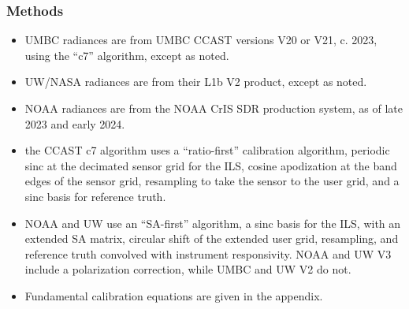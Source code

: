 \documentclass[9pt]{beamer}
\begin{document}
\begin{frame}
\frametitle{Methods}
\begin{itemize}

  \item UMBC radiances are from UMBC CCAST versions V20 or V21,
    c. 2023, using the ``c7'' algorithm, except as noted.

  \item UW/NASA radiances are from their L1b V2 product, except as
    noted. 

  \item NOAA radiances are from the NOAA CrIS SDR production system,
    as of late 2023 and early 2024.

  \item the CCAST c7 algorithm uses a ``ratio-first'' calibration
    algorithm, periodic sinc at the decimated sensor grid for the
    ILS, cosine apodization at the band edges of the sensor grid,
    resampling to take the sensor to the user grid, and a sinc basis
    for reference truth.

  \item NOAA and UW use an ``SA-first'' algorithm, a sinc basis for
    the ILS, with an extended SA matrix, circular shift of the
    extended user grid, resampling, and reference truth convolved
    with instrument responsivity.  NOAA and UW V3 include a
    polarization correction, while UMBC and UW V2 do not.

  \item Fundamental calibration equations are given in the appendix.

\end{itemize}
\end{frame}
\end{document}
